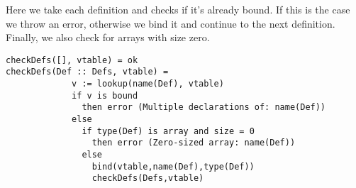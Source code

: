 Here we take each definition and checks if it's already bound.  If this is the
case we throw an error, otherwise we bind it and continue to the next
definition. Finally, we also check for arrays with size zero.

\begin{verbatim}
checkDefs([], vtable) = ok
checkDefs(Def :: Defs, vtable) =
             v := lookup(name(Def), vtable)
             if v is bound
               then error (Multiple declarations of: name(Def))
             else
               if type(Def) is array and size = 0
                 then error (Zero-sized array: name(Def))
               else
                 bind(vtable,name(Def),type(Def))
                 checkDefs(Defs,vtable)
\end{verbatim}

